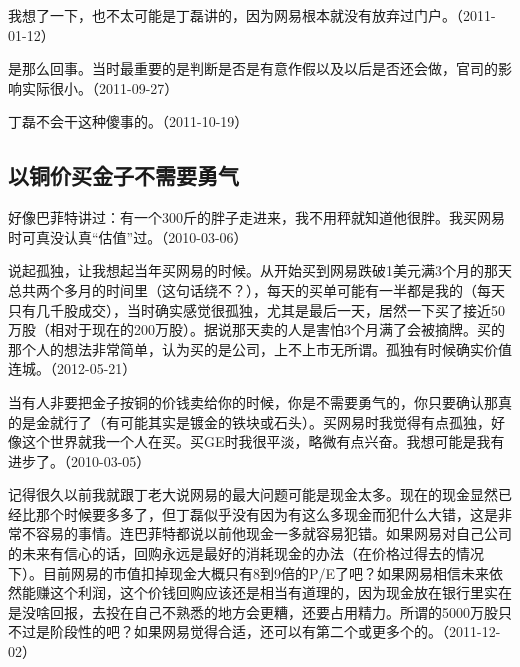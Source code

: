 我想了一下，也不太可能是丁磊讲的，因为网易根本就没有放弃过门户。（2011-01-12）


是那么回事。当时最重要的是判断是否是有意作假以及以后是否还会做，官司的影响实际很小。（2011-09-27）


丁磊不会干这种傻事的。（2011-10-19）

\subsection{以铜价买金子不需要勇气}


好像巴菲特讲过：有一个300斤的胖子走进来，我不用秤就知道他很胖。我买网易时可真没认真“估值”过。（2010-03-06）

说起孤独，让我想起当年买网易的时候。从开始买到网易跌破1美元满3个月的那天总共两个多月的时间里（这句话绕不？），每天的买单可能有一半都是我的（每天只有几千股成交），当时确实感觉很孤独，尤其是最后一天，居然一下买了接近50万股（相对于现在的200万股）。据说那天卖的人是害怕3个月满了会被摘牌。买的那个人的想法非常简单，认为买的是公司，上不上市无所谓。孤独有时候确实价值连城。（2012-05-21）


当有人非要把金子按铜的价钱卖给你的时候，你是不需要勇气的，你只要确认那真的是金就行了（有可能其实是镀金的铁块或石头）。买网易时我觉得有点孤独，好像这个世界就我一个人在买。买GE时我很平淡，略微有点兴奋。我想可能是我有进步了。（2010-03-05）



记得很久以前我就跟丁老大说网易的最大问题可能是现金太多。现在的现金显然已经比那个时候要多多了，但丁磊似乎没有因为有这么多现金而犯什么大错，这是非常不容易的事情。连巴菲特都说以前他现金一多就容易犯错。如果网易对自己公司的未来有信心的话，回购永远是最好的消耗现金的办法（在价格过得去的情况下）。目前网易的市值扣掉现金大概只有8到9倍的P/E了吧？如果网易相信未来依然能赚这个利润，这个价钱回购应该还是相当有道理的，因为现金放在银行里实在是没啥回报，去投在自己不熟悉的地方会更糟，还要占用精力。所谓的5000万股只不过是阶段性的吧？如果网易觉得合适，还可以有第二个或更多个的。（2011-12-02）

